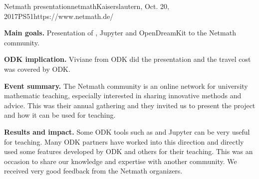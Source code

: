\begin{event}{Netmath presentation}{netmath}{Kaiserslautern, Oct. 20, 2017}{PS}{5}{1}{https://www.netmath.de/}

\textbf{Main goals.} Presentation of \Sage, Jupyter and OpenDreamKit to the Netmath community.

\textbf{ODK implication.} Viviane from ODK did the presentation and the travel cost was covered by ODK.

\textbf{Event summary.} The Netmath community is an online network for university mathematic teaching, especially interested in sharing innovative methods and advice. This was their annual gathering and they invited us to present the project and how it can be used for teaching.

\textbf{Results and impact.} Some ODK tools such as \Sage and Jupyter can be very useful for teaching. Many ODK partners have worked into this direction and directly used some features developed by ODK and others for their teaching. This was an occasion to share our knowledge and expertise with another community. We received very good feedback from the Netmath organizers.


\end{event}